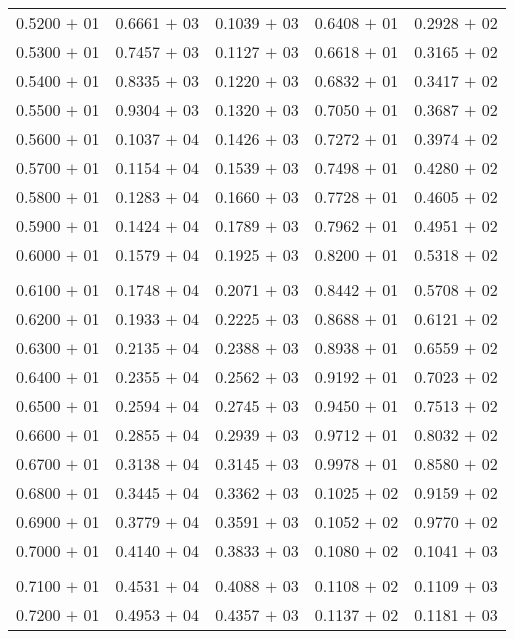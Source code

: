 \documentclass[a4paper,11pt]{article}
\begin{document}
\begin{center}
\begin{longtable}{ c c c c c }
0.5200 $+$ 01 & 0.6661 $+$ 03 & 0.1039 $+$ 03 & 0.6408 $+$ 01 & 0.2928 $+$ 02 \\
0.5300 $+$ 01 & 0.7457 $+$ 03 & 0.1127 $+$ 03 & 0.6618 $+$ 01 & 0.3165 $+$ 02 \\
0.5400 $+$ 01 & 0.8335 $+$ 03 & 0.1220 $+$ 03 & 0.6832 $+$ 01 & 0.3417 $+$ 02 \\
0.5500 $+$ 01 & 0.9304 $+$ 03 & 0.1320 $+$ 03 & 0.7050 $+$ 01 & 0.3687 $+$ 02 \\
0.5600 $+$ 01 & 0.1037 $+$ 04 & 0.1426 $+$ 03 & 0.7272 $+$ 01 & 0.3974 $+$ 02 \\
0.5700 $+$ 01 & 0.1154 $+$ 04 & 0.1539 $+$ 03 & 0.7498 $+$ 01 & 0.4280 $+$ 02 \\
0.5800 $+$ 01 & 0.1283 $+$ 04 & 0.1660 $+$ 03 & 0.7728 $+$ 01 & 0.4605 $+$ 02 \\
0.5900 $+$ 01 & 0.1424 $+$ 04 & 0.1789 $+$ 03 & 0.7962 $+$ 01 & 0.4951 $+$ 02 \\
0.6000 $+$ 01 & 0.1579 $+$ 04 & 0.1925 $+$ 03 & 0.8200 $+$ 01 & 0.5318 $+$ 02 \\
\\
0.6100 $+$ 01 & 0.1748 $+$ 04 & 0.2071 $+$ 03 & 0.8442 $+$ 01 & 0.5708 $+$ 02 \\
0.6200 $+$ 01 & 0.1933 $+$ 04 & 0.2225 $+$ 03 & 0.8688 $+$ 01 & 0.6121 $+$ 02 \\
0.6300 $+$ 01 & 0.2135 $+$ 04 & 0.2388 $+$ 03 & 0.8938 $+$ 01 & 0.6559 $+$ 02 \\
0.6400 $+$ 01 & 0.2355 $+$ 04 & 0.2562 $+$ 03 & 0.9192 $+$ 01 & 0.7023 $+$ 02 \\
0.6500 $+$ 01 & 0.2594 $+$ 04 & 0.2745 $+$ 03 & 0.9450 $+$ 01 & 0.7513 $+$ 02 \\
0.6600 $+$ 01 & 0.2855 $+$ 04 & 0.2939 $+$ 03 & 0.9712 $+$ 01 & 0.8032 $+$ 02 \\
0.6700 $+$ 01 & 0.3138 $+$ 04 & 0.3145 $+$ 03 & 0.9978 $+$ 01 & 0.8580 $+$ 02 \\
0.6800 $+$ 01 & 0.3445 $+$ 04 & 0.3362 $+$ 03 & 0.1025 $+$ 02 & 0.9159 $+$ 02 \\
0.6900 $+$ 01 & 0.3779 $+$ 04 & 0.3591 $+$ 03 & 0.1052 $+$ 02 & 0.9770 $+$ 02 \\
0.7000 $+$ 01 & 0.4140 $+$ 04 & 0.3833 $+$ 03 & 0.1080 $+$ 02 & 0.1041 $+$ 03 \\
\\
0.7100 $+$ 01 & 0.4531 $+$ 04 & 0.4088 $+$ 03 & 0.1108 $+$ 02 & 0.1109 $+$ 03 \\
0.7200 $+$ 01 & 0.4953 $+$ 04 & 0.4357 $+$ 03 & 0.1137 $+$ 02 & 0.1181 $+$ 03 \\

\end{longtable}
\end{center}
\end{document}
